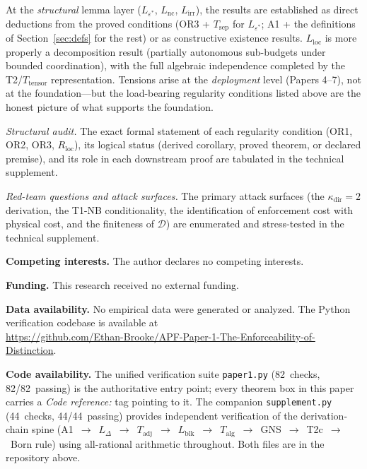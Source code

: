 \documentclass[11pt]{article}
\theoremstyle{remark}
\begin{document}
At the \emph{structural} lemma layer ($L_{\varepsilon^*}$, $L_{\mathrm{nc}}$, $L_{\mathrm{irr}}$), the results are established as direct deductions from the proved conditions (OR3 + $T_{\mathrm{sep}}$ for $L_{\varepsilon^*}$; A1 + the definitions of Section~\ref{sec:defs} for the rest) or as constructive existence results.  $L_{\mathrm{loc}}$ is more properly a decomposition result (partially autonomous sub-budgets under bounded coordination), with the full algebraic independence completed by the T2/$T_{\mathrm{tensor}}$ representation.  Tensions arise at the \emph{deployment} level (Papers 4--7), not at the foundation---but the load-bearing regularity conditions listed above are the honest picture of what supports the foundation.

\smallskip\noindent\textit{Structural audit.}  The exact formal statement of each regularity condition (OR1, OR2, OR3, $R_{\mathrm{loc}}$), its logical status (derived corollary, proved theorem, or declared premise), and its role in each downstream proof are tabulated in the technical supplement.


\smallskip\noindent\textit{Red-team questions and attack surfaces.}  The primary attack surfaces (the $\kappa_{\mathrm{dir}} = 2$ derivation, the T1-NB conditionality, the identification of enforcement cost with physical cost, and the finiteness of $\mathcal{D}$) are enumerated and stress-tested in the technical supplement.


\noindent\textbf{Competing interests.}  The author declares no competing interests.

\noindent\textbf{Funding.}  This research received no external funding.

\noindent\textbf{Data availability.}  No empirical data were generated or analyzed.  The Python verification codebase is available at\\ \url{https://github.com/Ethan-Brooke/APF-Paper-1-The-Enforceability-of-Distinction}.

\noindent\textbf{Code availability.}  The unified verification suite \texttt{paper1.py} (82~checks, 82/82~passing) is the authoritative entry point; every theorem box in this paper carries a \textit{Code reference:} tag pointing to it.  The companion \texttt{supplement.py} (44~checks, 44/44~passing) provides independent verification of the derivation-chain spine (A1~$\to$~$L_\Delta$~$\to$~$T_{\mathrm{adj}}$~$\to$~$L_{\mathrm{blk}}$~$\to$~$T_{\mathrm{alg}}$~$\to$~GNS~$\to$~T2c~$\to$~Born rule) using all-rational arithmetic throughout.  Both files are in the repository above.
\end{document}
